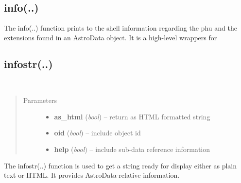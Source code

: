 \documentclass[letterpaper,10pt,english]{sphinxmanual}
\begin{document}
\subsection{info(..)}
\label{chapter_AstroDataClass:info}

\begin{fulllineitems}
\label{chapter_AstroDataClass:astrodata.data.AstroData.info}
The info(..) function prints to the shell information regarding
the phu and the extensions found in an AstroData object.  It is a 
high-level wrappers for 

\end{fulllineitems}



\subsection{infostr(..)}
\label{chapter_AstroDataClass:infostr}

\begin{fulllineitems}
\label{chapter_AstroDataClass:astrodata.data.AstroData.infostr}~\begin{quote}\begin{description}
\item[{Parameters}] \leavevmode\begin{itemize}
\item {} 
\textbf{as\_html} (\emph{bool}) -- return as HTML formatted string

\item {} 
\textbf{oid} (\emph{bool}) -- include object id

\item {} 
\textbf{help} (\emph{bool}) -- include sub-data reference information

\end{itemize}

\end{description}\end{quote}

The infostr(..) function is used to get a string ready for display
either as plain text or HTML.  It provides AstroData-relative
information.

\end{fulllineitems}
\end{document}
